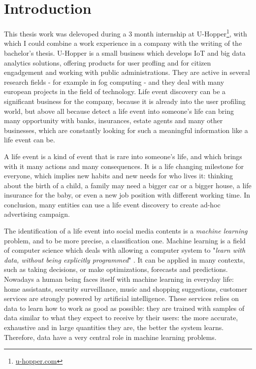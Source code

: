 \chapter{Introduction}
\label{cha:intro}

This thesis work was delevoped during a 3 month internship at U-Hopper\footnote{\url{u-hopper.com}}, with which I could combine a work experience in a company with the writing of the bachelor's thesis. U-Hopper is a small business which develops IoT and big data analytics solutions, offering products for user profling and for citizen engadgement and working with public administrations. They are active in several research fields - for example in fog computing - and they deal with many european projects in the field of technology. Life event discovery can be a significant business for the company, because it is already into the user profiling world, but above all because detect a life event into someone's life can bring many opportunity with banks, insurances, estate agents and many other businesses, which are constantly looking for such a meaningful information like a life event can be.

A life event is a kind of event that is rare into someone's life, and which brings with it many actions and many consequences. It is a life changing milestone for everyone, which implies new habits and new needs for who lives it: thinking about the birth of a child, a family may need a bigger car or a bigger house, a life insurance for the baby, or even a new job position with different working time. In conclusion, many entities can use a life event discovery to create ad-hoc advertising campaign. 

The identification of a life event into social media contents is a \textit{machine learning} problem, and to be more precise, a classification one. Machine learning is a field of computer science which deals with allowing a computer system to "\textit{learn with data, without being explicitly programmed}" \cite{samuel1959some}. It can be applied in many contexts, such as taking decisions, or make optimizations, forecasts and predictions. Nowadays a human being faces itself with machine learning in everyday life: home assistants, security surveillance, music and shopping suggestions, customer services are strongly powered by artificial intelligence. These services relies on data to learn how to work as good as possible: they are trained with samples of data similar to what they expect to receive by their users: the more accurate, exhaustive and in large quantities they are, the better the system learns. Therefore, data have a very central role in machine learning problems.

